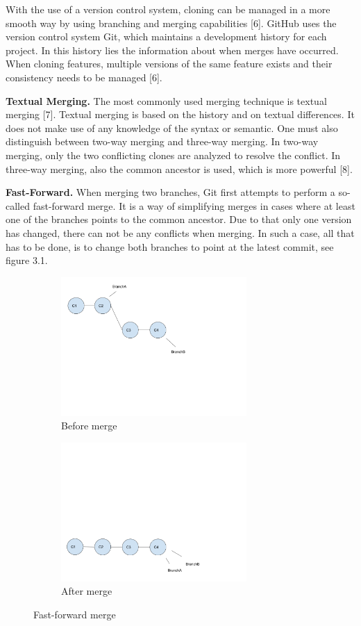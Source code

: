 With the use of a version control system, cloning can be managed in a more smooth way by using branching and merging capabilities [6]. GitHub uses the version control system Git, which maintains a development history for each project. In this history lies the information about when merges have occurred. When cloning features, multiple versions of the same feature exists and their consistency needs to be managed [6].

\textbf{Textual Merging.} The most commonly used merging technique is textual merging [7]. Textual merging is based on the history and on textual differences. It does not make use of any knowledge of the syntax or semantic. One must also distinguish between two-way merging and three-way merging. In two-way merging, only the two conflicting clones are analyzed to resolve the conflict. In three-way merging, also the common ancestor is used, which is more powerful [8].

\textbf{Fast-Forward.} When merging two branches, Git first attempts to perform a so-called fast-forward merge. It is a way of simplifying merges in cases where at least one of the branches points to the common ancestor. Due to that only one version has changed, there can not be any conflicts when merging. In such a case, all that has to be done, is to change both branches to point at the latest commit, see figure 3.1.
\begin{figure}[h]
   \centering
   \begin{subfigure}[b]{0.3\textwidth}
       \includegraphics[width=200pt]{figure/ff1.png}
       \caption{Before merge}
       \label{fig:fbranch1}
   \end{subfigure}
   \begin{subfigure}[b]{0.3\textwidth}
       \includegraphics[width=200pt]{figure/ff2.png}
       \caption{After merge}
       \label{fig:fbranch3}
   \end{subfigure}
   \caption{Fast-forward merge}\label{fig:fastforward}
\end{figure}

